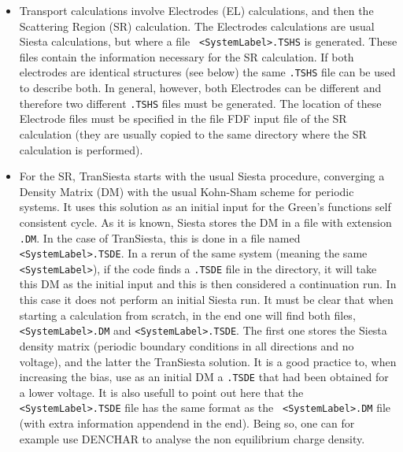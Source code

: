 \documentclass[11pt]{article}
\begin{document}
\begin{itemize}
\item 
Transport calculations involve Electrodes (EL) calculations, and then
the Scattering Region (SR) calculation.  The Electrodes calculations
are usual {\sc Siesta} calculations, but where a file {\tt
  <SystemLabel>.TSHS} is generated.  These files contain the
information necessary for the SR calculation.  If both electrodes are
identical structures (see below) the same {\tt .TSHS} file can be used
to describe both.  In general, however, both Electrodes can be
different and therefore two different {\tt .TSHS} files must be
generated.  The location of these Electrode files must be specified in
the file FDF input file of the SR calculation (they are usually copied
to the same directory where the SR calculation is performed).

\item
For the SR, {\sc TranSiesta} starts with the usual {\sc Siesta}
procedure, converging a Density Matrix (DM) with the usual Kohn-Sham
scheme for periodic systems. It uses this solution as an initial input
for the Green's functions self consistent cycle. As it is known, {\sc
  Siesta} stores the DM in a file with extension {\tt .DM}. In the
case of {\sc TranSiesta}, this is done in a file named {\tt
  <SystemLabel>.TSDE}.  In a rerun of the same system (meaning the
same {\tt <SystemLabel>}), if the code finds a {\tt.TSDE} file in the
directory, it will take this DM as the initial input and this is then
considered a continuation run. In this case it does not perform an
initial {\sc Siesta} run. It must be clear that when starting a
calculation from scratch, in the end one will find both files, {\tt
  <SystemLabel>.DM} and {\tt <SystemLabel>.TSDE}.  The first one
stores the {\sc Siesta} density matrix (periodic boundary conditions
in all directions and no voltage), and the latter the {\sc TranSiesta}
solution. It is a good practice to, when increasing the bias, use as
an initial DM a {\tt .TSDE} that had been obtained for a lower
voltage. It is also usefull to point out here that the {\tt
  <SystemLabel>.TSDE} file has the same format as the {\tt
  <SystemLabel>.DM} file (with extra information appendend in the
end). Being so, one can for example use DENCHAR to analyse the non
equilibrium charge density.


\end{itemize}
\end{document}
